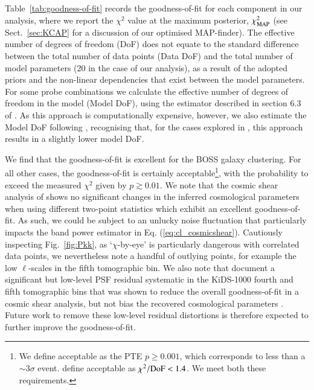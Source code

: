 Table~\ref{tab:goodness-of-fit} records the goodness-of-fit for each component in our \tttp analysis, where we report the $\chi^2$ value at the maximum posterior, $\chi^2_{\rm MAP}$ (see Sect.~\ref{sec:KCAP} for a discussion of our optimised MAP-finder).  
The effective number of degrees of freedom (DoF) does not equate to the standard difference between the total number of data points (Data DoF) and the total number of model parameters (20 in the case of our \tttp analysis), as a result of the adopted priors and the non-linear dependencies that exist between the model parameters.   For some probe combinations we calculate the effective number of degrees of freedom in the model (Model DoF), using the estimator described in section 6.3 of \citet{joachimi/etal:inprep}.    
As this approach is computationally expensive, however, we also estimate the Model DoF following \citet{Raveri2019}, recognising that, for the cases explored in \citet{joachimi/etal:inprep}, this approach results in a slightly lower model DoF.

We find that the goodness-of-fit is excellent for the BOSS galaxy clustering.  For all other cases, the goodness-of-fit is certainly acceptable\footnote{We define acceptable as the PTE $p \geq 0.001$, which corresponds to less than a $\sim 3\sigma$ event.   \citet{abbott/etal:2018} define acceptable as $\chi^2/{\rm DoF} < 1.4$.  We meet both these requirements.}, with the probability to exceed the measured $\chi^2$ given by $p \gtrsim 0.01$.
We note that the cosmic shear analysis of \citet{asgari/etal:inprep} shows no significant changes in the inferred cosmological parameters when using different two-point statistics which exhibit an excellent goodness-of-fit.    As such, we could be subject to an unlucky noise fluctuation that particularly impacts the band power estimator in Eq. (\ref{eq:cl_cosmicshear}).  Cautiously inspecting Fig.~\ref{fig:Pkk}, as `$\chi$-by-eye' is particularly dangerous with correlated data points, we nevertheless note a handful of outlying points, for example the low $\ell$-scales in the fifth tomographic bin.   We also note that \citet{giblin/etal:inprep} document a significant but low-level PSF residual systematic in the KiDS-1000 fourth and fifth tomographic bins that was shown to reduce the overall goodness-of-fit in a cosmic shear analysis, but not bias the recovered cosmological parameters \citep[see the discussion in][]{amara/refregier:2008}.  Future work to remove these low-level residual distortions is therefore expected to further improve the goodness-of-fit.

